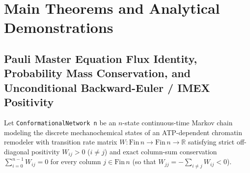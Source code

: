 \documentclass[11pt,a4paper]{article}
\theoremstyle{definition}
\begin{document}
\section{Main Theorems and Analytical Demonstrations}

\subsection{Pauli Master Equation Flux Identity, Probability Mass Conservation, and Unconditional Backward-Euler / IMEX Positivity}

Let \texttt{ConformationalNetwork n} be an $n$-state continuous-time Markov chain modeling the discrete mechanochemical states of an ATP-dependent chromatin remodeler with transition rate matrix $W : \mathrm{Fin}\,n \to \mathrm{Fin}\,n \to \mathbb{R}$ satisfying strict off-diagonal positivity $W_{ij} > 0$ ($i \ne j$) and exact column-sum conservation $\sum_{i=0}^{n-1} W_{ij} = 0$ for every column $j \in \mathrm{Fin}\,n$ (so that $W_{jj} = -\sum_{i \ne j} W_{ij} < 0$).
\end{document}
